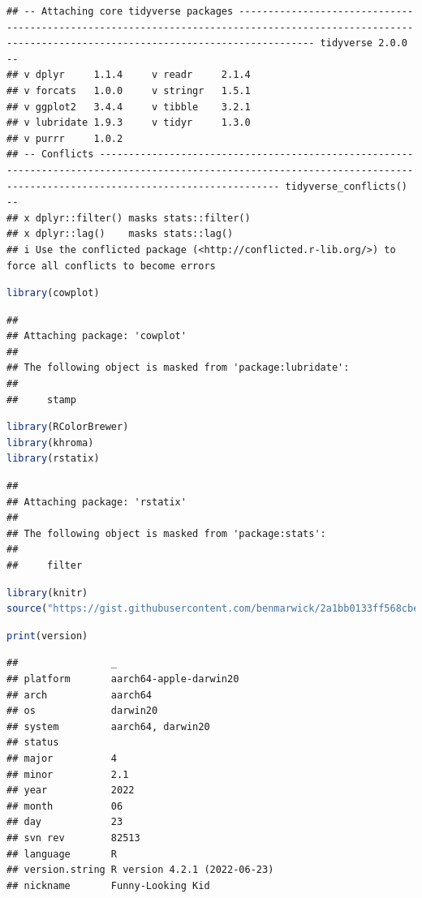 \documentclass[
]{book}
\begin{document}
\begin{lstlisting}
## -- Attaching core tidyverse packages --------------------------------------------------------------------------------------------------------------------------------------------------------- tidyverse 2.0.0 --
## v dplyr     1.1.4     v readr     2.1.4
## v forcats   1.0.0     v stringr   1.5.1
## v ggplot2   3.4.4     v tibble    3.2.1
## v lubridate 1.9.3     v tidyr     1.3.0
## v purrr     1.0.2     
## -- Conflicts --------------------------------------------------------------------------------------------------------------------------------------------------------------------------- tidyverse_conflicts() --
## x dplyr::filter() masks stats::filter()
## x dplyr::lag()    masks stats::lag()
## i Use the conflicted package (<http://conflicted.r-lib.org/>) to force all conflicts to become errors
\end{lstlisting}

\begin{lstlisting}[language=R]
library(cowplot)
\end{lstlisting}

\begin{lstlisting}
## 
## Attaching package: 'cowplot'
## 
## The following object is masked from 'package:lubridate':
## 
##     stamp
\end{lstlisting}

\begin{lstlisting}[language=R]
library(RColorBrewer)
library(khroma)
library(rstatix)
\end{lstlisting}

\begin{lstlisting}
## 
## Attaching package: 'rstatix'
## 
## The following object is masked from 'package:stats':
## 
##     filter
\end{lstlisting}

\begin{lstlisting}[language=R]
library(knitr)
source("https://gist.githubusercontent.com/benmarwick/2a1bb0133ff568cbe28d/raw/fb53bd97121f7f9ce947837ef1a4c65a73bffb3f/geom_flat_violin.R")
\end{lstlisting}

\begin{lstlisting}[language=R]
print(version)
\end{lstlisting}

\begin{lstlisting}
##                _                           
## platform       aarch64-apple-darwin20      
## arch           aarch64                     
## os             darwin20                    
## system         aarch64, darwin20           
## status                                     
## major          4                           
## minor          2.1                         
## year           2022                        
## month          06                          
## day            23                          
## svn rev        82513                       
## language       R                           
## version.string R version 4.2.1 (2022-06-23)
## nickname       Funny-Looking Kid
\end{lstlisting}
\end{document}
